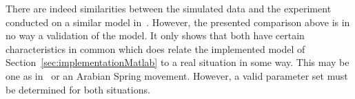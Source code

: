 There are indeed similarities between the simulated data and the experiment
conducted on a similar model in~\cite{centola2010spread}.  However, the
presented comparison above is in no way a validation of the model.  It only
shows that both have certain characteristics in common which does relate the
implemented model of Section~\ref{sec:implementationMatlab} to a real situation
in some way.  This may be one as in~\cite{centola2010spread} or an Arabian
Spring movement.  However, a valid parameter set must be determined for both
situations.

